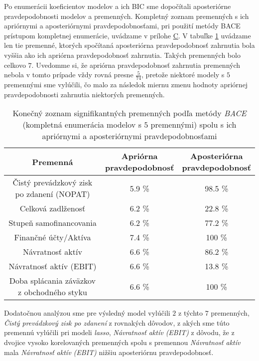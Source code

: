 Po enumerácii koeficientov modelov a ich BIC sme dopočítali aposteriórne pravdepodobnosti modelov a premenných.
Kompletný zoznam premenných s ich apriórnymi a aposteriórnymi pravdepodobnosťami, pri použití metódy BACE prístupom kompletnej enumerácie, uvádzame v prílohe \hyperref[appendix:c]{C}.
V tabuľke \ref{bace1 tabulka pp} uvádzame len tie premenné, ktorých spočítaná aposteriórna pravdepodobnosť zahrnutia bola vyššia ako ich apriórna pravdepodobnosť zahrnutia.
Takých premenných bolo celkovo \(7\).
Uvedomme si, že apriórna pravdepodobnosť zahrnutia premenných nebola v tomto prípade vždy rovná presne \(\frac{5}{74}\),
pretože niektoré modely s \(5\) premennými sme vylúčili, čo malo za následok miernu zmenu hodnoty apriórnej pravdepodobnosti zahrnutia niektorých premenných.

\begin{table}
    \begin{tabular}{ |c|c|c| }
        \hline
        Premenná & \makecell{Apriórna \\ pravdepodobnosť} & \makecell{Aposteriórna \\ pravdepodobnosť} \\
        \hline
        Čistý prevádzkový zisk po zdanení (NOPAT) & 5.9 \% & 98.5 \% \\
        \hline
        Celková zadlženosť & 6.2 \% & 22.8 \% \\
        \hline
        Stupeň samofinancovania & 6.2 \% & 77.2 \% \\
        \hline
        Finančné účty/Aktíva & 7.4 \% & 100 \% \\
        \hline
        Návratnosť aktív & 6.6 \% & 86.2 \%\\
        \hline
        Návratnosť aktív (EBIT) & 6.6 \% & 13.8 \% \\
        \hline
        Doba splácania záväzkov z obchodného styku & 6.6 \% & 100 \% \\
        \hline
    \end{tabular}
    \caption{Konečný zoznam signifikantných premenných podľa metódy \emph{BACE} (kompletná enumerácia modelov s \(5\) premennými) spolu s ich apriórnymi a aposteriórnymi pravdepodobnosťami}
    \label{bace1 tabulka pp}
\end{table}

Dodatočnou analýzou sme pre výsledný model vylúčili \(2\) z týchto \(7\) premenných, \emph{Čistý prevádzkový zisk po zdanení} z rovnakých dôvodov,
z akých sme túto premennú vylúčili pri modeli \emph{lasso}, \emph{Návratnosť aktív (EBIT)} z dôvodu,
že z dvojice vysoko korelovaných premenných spolu s premennou \emph{Návratnosť aktív} mala \emph{Návratnosť aktív (EBIT)} nižšiu aposteriórnu pravdepodobnosť.

